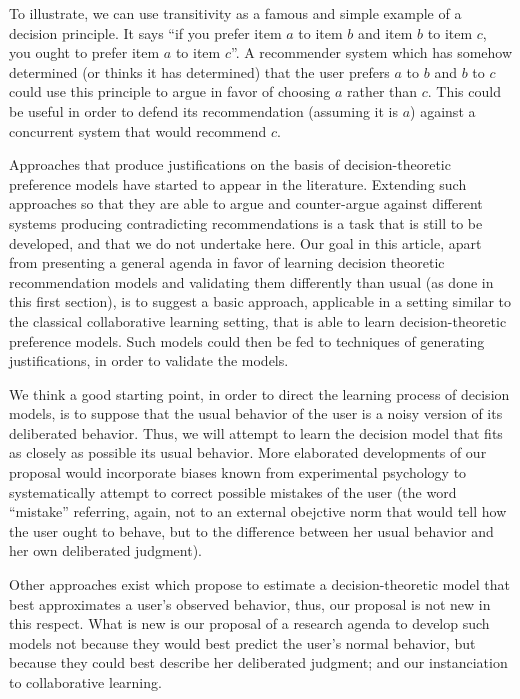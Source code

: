 \documentclass[version=last, pagesize, twoside=off, bibliography=totoc, DIV=calc, fontsize=14pt, a4paper, french, english]{scrartcl}
\begin{document}
To illustrate, we can use transitivity as a famous and simple example of a decision principle. It says “if you prefer item $a$ to item $b$ and item $b$ to item $c$, you ought to prefer item $a$ to item $c$”. A recommender system which has somehow determined (or thinks it has determined) that the user prefers $a$ to $b$ and $b$ to $c$ could use this principle to argue in favor of choosing $a$ rather than $c$. This could be useful in order to defend its recommendation (assuming it is $a$) against a concurrent system that would recommend $c$.

Approaches that produce justifications on the basis of decision-theoretic preference models have started to appear in the literature. Extending such approaches so that they are able to argue and counter-argue against different systems producing contradicting recommendations is a task that is still to be developed, and that we do not undertake here. Our goal in this article, apart from presenting a general agenda in favor of learning decision theoretic recommendation models and validating them differently than usual (as done in this first section), is to suggest a basic approach, applicable in a setting similar to the classical collaborative learning setting, that is able to learn decision-theoretic preference models. Such models could then be fed to techniques of generating justifications, in order to validate the models.

We think a good starting point, in order to direct the learning process of decision models, is to suppose that the usual behavior of the user is a noisy version of its deliberated behavior. Thus, we will attempt to learn the decision model that fits as closely as possible its usual behavior. More elaborated developments of our proposal would incorporate biases known from experimental psychology to systematically attempt to correct possible mistakes of the user (the word “mistake” referring, again, not to an external obejctive norm that would tell how the user ought to behave, but to the difference between her usual behavior and her own deliberated judgment).

Other approaches exist which propose to estimate a decision-theoretic model that best approximates a user’s observed behavior, thus, our proposal is not new in this respect. What is new is our proposal of a research agenda to develop such models not because they would best predict the user’s normal behavior, but because they could best describe her deliberated judgment; and our instanciation to collaborative learning.
\end{document}
